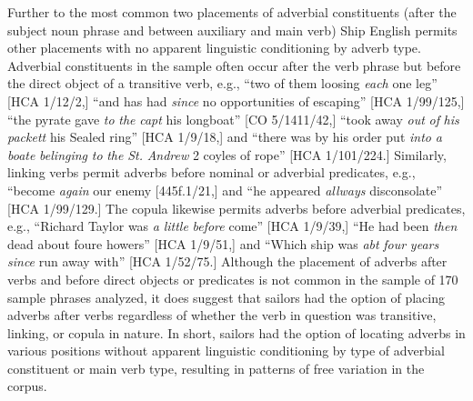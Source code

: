   Further to the most common two placements of adverbial constituents (after the subject noun phrase and between auxiliary and main verb) Ship English permits other placements with no apparent linguistic conditioning by adverb type. Adverbial constituents in the sample often occur after the verb phrase but before the direct object of a transitive verb, e.g., “two of them loosing \textit{each} one leg” [HCA 1/12/2,] “and has had \textit{since} no opportunities of escaping” [HCA 1/99/125,] “the pyrate gave \textit{to} \textit{the} \textit{capt} his longboat” [CO 5/1411/42,] “took away \textit{out} \textit{of} \textit{his} \textit{packett} his Sealed ring” [HCA 1/9/18,] and “there was by his order put \textit{into} \textit{a} \textit{boate} \textit{belinging} \textit{to} \textit{the} \textit{St.} \textit{Andrew} 2 coyles of rope” [HCA 1/101/224.] Similarly, linking verbs permit adverbs before nominal or adverbial predicates, e.g., “become \textit{again} our enemy [445f.1/21,] and “he appeared \textit{allways} disconsolate” [HCA 1/99/129.] The copula likewise permits adverbs before adverbial predicates, e.g., “Richard Taylor was \textit{a} \textit{little} \textit{before} come” [HCA 1/9/39,] “He had been \textit{then} dead about foure howers” [HCA 1/9/51,] and “Which ship was \textit{abt} \textit{four} \textit{years} \textit{since} run away with” [HCA 1/52/75.] Although the placement of adverbs after verbs and before direct objects or predicates is not common in the sample of 170 sample phrases analyzed, it does suggest that sailors had the option of placing adverbs after verbs regardless of whether the verb in question was transitive, linking, or copula in nature. In short, sailors had the option of locating adverbs in various positions without apparent linguistic conditioning by type of adverbial constituent or main verb type, resulting in patterns of free variation in the corpus. 

